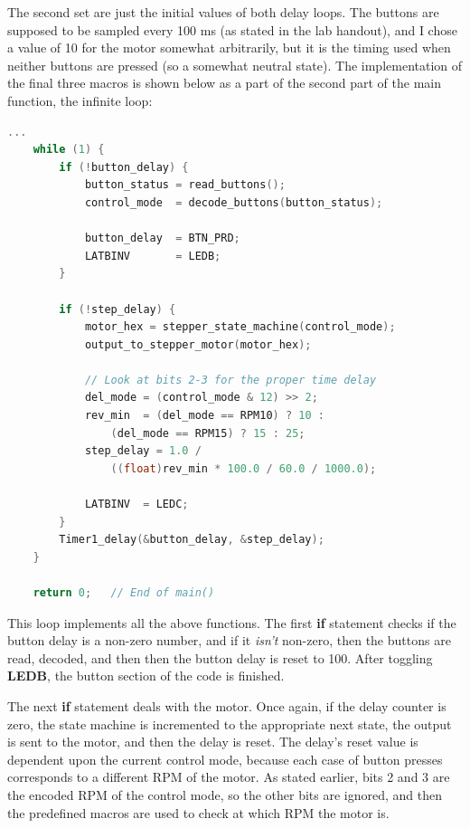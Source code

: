 \documentclass[a4paper, 12pt]{article}
\begin{document}
The second set are just the initial values of both delay loops. The buttons are supposed to be sampled every 100 ms (as stated in the lab handout), and I chose a value of 10 for the motor somewhat arbitrarily, but it is the timing used when neither buttons are pressed (so a somewhat neutral state). The implementation of the final three macros is shown below as a part of the second part of the main function, the infinite loop:

	\begin{mdframed}[backgroundcolor=code-gray, roundcorner=10pt,
								innerleftmargin=5, innertopmargin=5, innerbottommargin=5]	
	\begin{lstlisting}[language=C, caption=Infinite Program Loop, tabsize=2]
	...	
	while (1) {
		if (!button_delay) {
			button_status = read_buttons();
			control_mode  = decode_buttons(button_status);

			button_delay  = BTN_PRD;
			LATBINV       = LEDB;
		}

		if (!step_delay) {
			motor_hex = stepper_state_machine(control_mode);
			output_to_stepper_motor(motor_hex);

			// Look at bits 2-3 for the proper time delay
			del_mode = (control_mode & 12) >> 2;
			rev_min  = (del_mode == RPM10) ? 10 :
				(del_mode == RPM15) ? 15 : 25;
			step_delay = 1.0 / 
				((float)rev_min * 100.0 / 60.0 / 1000.0);
            
			LATBINV  = LEDC;
		}
		Timer1_delay(&button_delay, &step_delay);
	}
    
	return 0;	// End of main()
	\end{lstlisting}
	\end{mdframed}
	
This loop implements all the above functions. The first \textbf{if} statement checks if the button delay is a non-zero number, and if it \textit{isn't} non-zero, then the buttons are read, decoded, and then then the button delay is reset to 100. After toggling \textbf{LEDB}, the button section of the code is finished. 

The next \textbf{if} statement deals with the motor. Once again, if the delay counter is zero, the state machine is incremented to the appropriate next state, the output is sent to the motor, and then the delay is reset. The delay's reset value is dependent upon the current control mode, because each case of button presses corresponds to a different RPM of the motor. As stated earlier, bits 2 and 3 are the encoded RPM of the control mode, so the other bits are ignored, and then the predefined macros are used to check at which RPM the motor is. 
\end{document}
